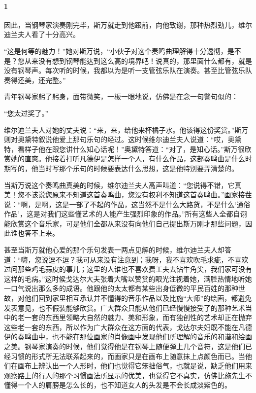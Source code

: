 \paragraph*{1}

\par 因此，当钢琴家演奏刚完毕，斯万就走到他跟前，向他致谢，那种热烈劲儿，维尔迪兰夫人看了十分高兴。
\par “这是何等的魅力！”她对斯万说，“小伙子对这个奏鸣曲理解得十分透彻，是不是？您从来没有想到钢琴能达到这么高的境界吧！说真的，那里面什么都有，就是没有钢琴声。每次听的时候，我都以为是听一支管弦乐队在演奏。甚至比管弦乐队奏得还美，还完整。”
\par 青年钢琴家躬了躬身，面带微笑，一板一眼地说，仿佛是在念一句警句似的：
\par “您太过奖了。”
\par 维尔迪兰夫人对她的丈夫说：“来，来，给他来杯橘子水。他该得这份奖赏。”斯万则对奥黛特叙说他爱上那句乐句的经过。这时候维尔迪兰夫人说道：“哎，奥黛特，看样子他在跟您讲什么知心话呢！”奥黛特答道：“对了，是知心话。”斯万很欣赏她的直爽。他接着打听凡德伊是怎样一个人，有什么作品，这部奏鸣曲是什么时期写的，他当时写那个乐句的时候要表达什么思想，这是他特别要弄清楚的。
\par 当斯万说这个奏鸣曲真美的时候，维尔迪兰夫人高声叫道：“您说得不错，它真美！您不该说您原来不知道这首奏鸣曲，您没有权利不知道这首奏鸣曲。”画家接茬说：“啊，是啊，这是一部了不起的作品，这当然不是什么大路货，不是什么‘通俗作品’，这是对我们这些懂艺术的人能产生强烈印象的作品。”所有这些人全都自诩能欣赏这个音乐家，可是他们全都从来没有向他们自己提出斯万刚才那些问题，因此谁也答不上来。
\par 甚至当斯万就他心爱的那个乐句发表一两点见解的时候，维尔迪兰夫人却答道：“嗨，您说逗不逗？我可从来没有注意到；我呀，我不喜欢吹毛求疵，不喜欢过问那些鸡毛蒜皮的事儿；这里的人谁也不喜欢费工夫去钻牛角尖，我们家可没有这样的毛病。”这时候戈达尔大夫张着大嘴以赞赏的眼光注视着她，满腔热情地听她一口气说出那么多的成语。他跟他的太太都有某些出身低微的平民百姓的那种世故，对他们回到家里相互承认并不懂得的音乐作品以及比施“大师”的绘画，都避免发表意见，也不假装能够欣赏。广大群众只能从他们已经慢慢接受了的那种艺术当中的老一套的东西里领略大自然的魅力、美和形象，而有独创性的艺术却正在抛弃这些老一套的东西，所以作为广大群众在这方面的代表，戈达尔夫妇既不能在凡德伊的奏鸣曲中，也不能在那位画家的肖像画中发现他们所理解的音乐的和谐和绘画之美。钢琴家演奏的时候，他们觉得他是在钢琴上随便弹上几个音符，这是他们已经习惯的形式所无法联系起来的，而画家只是在画布上随意抹上点颜色而已。当他们在画布上辨认出一个人形时，他们也觉得它笨拙俗气，也就是说，缺乏他们用来观察路上的行人的那个习惯画法所显示的优美，也觉得它不真实，仿佛比施先生不懂得一个人的肩膀是怎么长的，也不知道女人的头发是不会长成淡紫色的。
